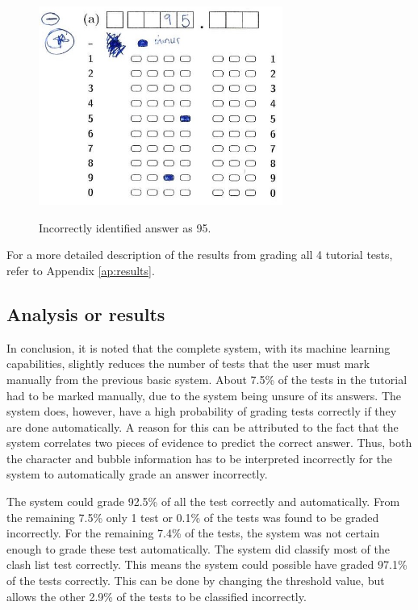 \begin{figure}
  \centering
  \includegraphics[width=8cm]{wrongResult}\\
  \caption{Incorrectly identified answer as 95.}
  \label{fig:wrongAns}
\end{figure}

For a more detailed description of the results from grading all 4 tutorial tests, refer to Appendix \ref{ap:results}.

\subsection{Analysis or results}

In conclusion, it is noted that the complete system, with its machine learning capabilities, slightly reduces the number of tests that the user must mark manually from the previous basic system. About 7.5\% of the tests in the tutorial had to be marked manually, due to the system being unsure of its answers. The system does, however, have a high probability of grading tests correctly if they are done automatically. A reason for this can be attributed to the fact that the system correlates two pieces of evidence to predict the correct answer. Thus, both the character and bubble information has to be interpreted incorrectly for the system to automatically grade an answer incorrectly. 

The system could grade 92.5\% of all the test correctly and automatically. From the remaining 7.5\% only 1 test or 0.1\% of the tests was found to be graded incorrectly. For the remaining 7.4\% of the tests, the system was not certain enough to grade these test automatically. The system did classify most of the clash list test correctly. This means the system could possible have graded 97.1\% of the tests correctly. This can be done by changing the threshold value, but allows the other 2.9\% of the tests to be classified incorrectly.


